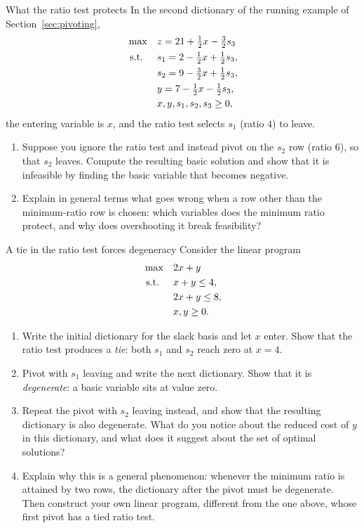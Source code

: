 \begin{ex}{What the ratio test protects}{}
\label{ex:ratio-test-wrong-row}
 In the second dictionary of the running example of Section~\ref{sec:pivoting},
\[
\begin{aligned}
\max\quad & z = 21 + \tfrac12 x - \tfrac32 s_3 \\
\mbox{ s.t. }\quad & s_1 = 2 - \tfrac12 x + \tfrac12 s_3, \\
& s_2 = 9 - \tfrac32 x + \tfrac12 s_3, \\
& y = 7 - \tfrac12 x - \tfrac12 s_3, \\
& x, y, s_1, s_2, s_3 \geq 0,
\end{aligned}
\]
the entering variable is $x$, and the ratio test selects $s_1$ (ratio $4$) to leave.
\begin{enumerate}
    \item Suppose you ignore the ratio test and instead pivot on the $s_2$ row (ratio $6$), so that $s_2$ leaves.  Compute the resulting basic solution and show that it is infeasible by finding the basic variable that becomes negative.
    \item Explain in general terms what goes wrong when a row other than the minimum-ratio row is chosen: which variables does the minimum ratio protect, and why does overshooting it break feasibility?
\end{enumerate}
\end{ex}


\begin{ex}{A tie in the ratio test forces degeneracy}{}
\label{ex:degenerate-tie}
 Consider the linear program
\[
\begin{aligned}
\max\quad & 2x + y \\
\mbox{ s.t. }\quad & x + y \leq 4, \\
& 2x + y \leq 8, \\
& x, y \geq 0.
\end{aligned}
\]
\begin{enumerate}
    \item Write the initial dictionary for the slack basis and let $x$ enter.  Show that the ratio test produces a \emph{tie}: both $s_1$ and $s_2$ reach zero at $x = 4$.
    \item Pivot with $s_1$ leaving and write the next dictionary.  Show that it is \emph{degenerate}: a basic variable sits at value zero.
    \item Repeat the pivot with $s_2$ leaving instead, and show that the resulting dictionary is also degenerate.  What do you notice about the reduced cost of $y$ in this dictionary, and what does it suggest about the set of optimal solutions?
    \item Explain why this is a general phenomenon: whenever the minimum ratio is attained by two rows, the dictionary after the pivot must be degenerate.  Then construct your own linear program, different from the one above, whose first pivot has a tied ratio test.
\end{enumerate}
\exrefs{\S\ref{sec:degeneracy}; \S\ref{sec:simplex-algorithm}}
\end{ex}

